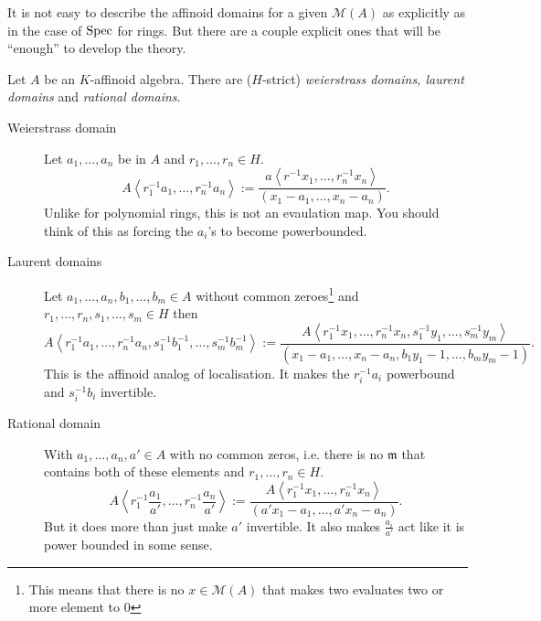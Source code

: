 It is not easy to describe the affinoid domains for a given $\mathcal{M} (A)$ as explicitly as in the case of $\operatorname{Spec}$ for rings. 
But there are a couple explicit ones that will be ``enough'' to develop the theory. 
\begin{definition}
	Let $A$ be an $K$-affinoid algebra. 
	There are ($H$-strict) \emph{weierstrass domains, laurent domains} and \emph{rational domains}. 
	\begin{description}
		\item[Weierstrass domain] Let $a_1, \ldots, a_n$ be in $A$ and $r_1, \ldots, r_n \in H$. 
			\[
				A\left<r_1^{-1}a_1, \ldots, r_n^{-1}a_n \right> := \frac{a\left<r^{-1}x_1, \ldots, r^{-1}_nx_n \right>}{(x_1-a_1, \ldots, x_n - a_n)}
			.\] 
			Unlike for polynomial rings, this is not an evaulation map. You should think of this as forcing the $a_i$'s to become powerbounded. 
		\item [Laurent domains]
			Let $a_1, \ldots, a_n, b_1, \ldots, b_m \in A$ without common zeroes\footnote{This means that there is no $x \in \mathcal{M} (A)$ that makes two evaluates two or more element to $0$} and $r_1,\ldots, r_n, s_1, \ldots, s_m \in H$ then \[
				A\left<r_1^{-1}a_1, \ldots, r_n^{-1}a_n, s^{-1}_1b_1^{-1}, \ldots, s^{-1}_mb_m^{-1} \right> := \frac{A\left<r^{-1}_1x_1, \ldots, r^{-1}_nx_n,s^{-1}_1y_1, \ldots,s_m^{-1} y_m  \right>}{(x_1 - a_1, \ldots, x_n - a_n, b_1 y_1 - 1, \ldots, b_m y_m - 1)}
			.\] 
			This is the affinoid analog of localisation. It makes the $r_i^{-1}a_i$ powerbound and $s_i^{-1}b_i$ invertible. 
		\item[Rational domain] With $a_1, \ldots, a_n, a' \in A$ with no common zeros, i.e. there is no $\mathfrak{m} $ that contains both of these elements and $r_1, \ldots, r_n \in H$. 
			\[
				A \left<r_1^{-1}\frac{a_1}{a'}, \ldots, r_n^{-1}\frac{a_n}{a'} \right> := \frac{A\left<r_1^{-1}x_1, \ldots, r_n^{-1}x_n \right>}{(a' x_1 - a_1, \ldots, a' x_n - a_n)}
			.\] 
			But it does more than just make $a'$ invertible. 
			It also makes $\frac{a_i}{ a'}$ act like it is power bounded in some sense. 
	\end{description}
\end{definition}

